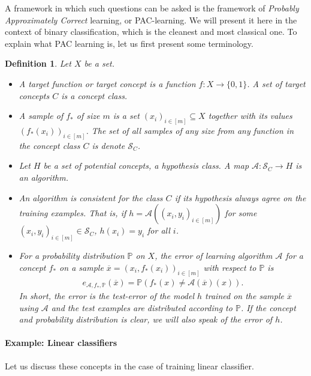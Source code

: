 \documentclass{article}
\newcommand{\calA}{\mathcal{A}}
\newcommand{\calS}{\mathcal{S}}
\newcommand{\sse}{\subseteq}
\newtheorem{defi}{Definition}
\begin{document}
A framework in which such questions can be asked is the framework of \emph{Probably Approximately Correct} learning, or PAC-learning.
We will present it here in the context of binary classification, which is the cleanest and most classical one. To explain what PAC learning is, let us first present some terminology.
\begin{defi}
    Let $X$ be a set. 
    \begin{itemize}
        \item A \emph{target function} or \emph{target concept} is a function $f:X \to \{0,1\}$. A set of target concepts $C$ is a \emph{concept class}. 

        \item A \emph{sample of $f_*$} of size $m$ is a set $(x_i)_{i \in [m]}\sse X$ together with its values $(f_*(x_i))_{i \in [m]}$. The set of all samples of any size from any function in the concept class $C$ is denote $\calS_C$.

        \item Let $H$ be a set of potential concepts, a \emph{hypothesis class}. A map $\calA : \calS_C \to H$ is an \emph{algorithm}.

        \item An algorithm is \emph{consistent for the class $C$} if its hypothesis always agree on the training examples. That is, if $h= \calA((x_i,y_i)_{i \in [m]})$ for some $(x_i,y_i)_{i \in [m]} \in \calS_C$,  $h(x_i)=y_i$ for all $i$.

        \item For a probability distribution $\mathbb{P}$ on $X$, the \emph{error of learning algorithm $\calA$ for a concept $f_*$ on a sample $\overline{x} = (x_i,f_*(x_i))_{i \in [m]}$ with respect to $\mathbb{P}$} is
        \begin{align*}
            e_{\calA,f_*,\mathbb{P}}(\overline{x}) = \mathbb{P}(f_*(x)\neq \calA(\overline{x})(x)).
        \end{align*}
        In short, the error is the test-error of the model $h$ trained on the sample $\overline{x}$ using $\calA$ and the test examples are distributed according to $\mathbb{P}$. If the concept and probability distribution is clear, we will also speak of the \emph{error of $h$}. 
    \end{itemize}
\end{defi}
\paragraph{Example: Linear classifiers}    Let us discuss these concepts in the case of training linear classifier.
\end{document}
